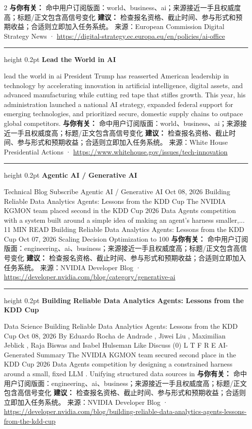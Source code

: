 \documentclass[10.5pt]{ctexart}
\begin{document}
\begin{multicols}{2}
\textbf{与你有关：} 命中用户订阅版面：world、business、ai；来源接近一手且权威度高；标题/正文包含高信号变化
\textbf{建议：} 检查报名资格、截止时间、参与形式和预期收益；合适则立即加入任务系统。
{\footnotesize\color{ormuted} 来源：European Commission Digital Strategy News · \url{https://digital-strategy.ec.europa.eu/en/policies/ai-office}}
\vspace{2mm}
\hrule height 0.2pt
\vspace{2mm}
{\large\bfseries Lead the World in AI}\par
lead the world in ai President Trump has reasserted American leadership in technology by accelerating innovation in artificial intelligence, digital assets, and advanced manufacturing while cutting red tape that stifles growth. This year, his administration launched a national AI strategy, expanded federal support for emerging technologies, and prioritized secure, domestic supply chains to outpace global competitors.
\textbf{与你有关：} 命中用户订阅版面：world、business、ai；来源接近一手且权威度高；标题/正文包含高信号变化
\textbf{建议：} 检查报名资格、截止时间、参与形式和预期收益；合适则立即加入任务系统。
{\footnotesize\color{ormuted} 来源：White House Presidential Actions · \url{https://www.whitehouse.gov/issues/tech-innovation}}
\vspace{2mm}
\hrule height 0.2pt
\vspace{2mm}
{\large\bfseries Agentic AI / Generative AI}\par
Technical Blog Subscribe Agentic AI / Generative AI Oct 08, 2026 Building Reliable Data Analytics Agents: Lessons from the KDD Cup The NVIDIA KGMON team placed second in the KDD Cup 2026 Data Agents competition with a system built around a simple idea of making an agent's harness smaller,... 11 MIN READ Building Reliable Data Analytics Agents: Lessons from the KDD Cup Oct 07, 2026 Scaling Decision Optimization to 100
\textbf{与你有关：} 命中用户订阅版面：engineering、ai、business；来源接近一手且权威度高；标题/正文包含高信号变化
\textbf{建议：} 检查报名资格、截止时间、参与形式和预期收益；合适则立即加入任务系统。
{\footnotesize\color{ormuted} 来源：NVIDIA Developer Blog · \url{https://developer.nvidia.com/blog/category/generative-ai}}
\vspace{2mm}
\hrule height 0.2pt
\vspace{2mm}
{\large\bfseries Building Reliable Data Analytics Agents: Lessons from the KDD Cup}\par
Data Science Building Reliable Data Analytics Agents: Lessons from the KDD Cup Oct 08, 2026 By Eduardo Rocha de Andrade , Jiwei Liu , Maximilian Jeblick , Raja Biswas and Isabel Hulseman Like Discuss (0) L T F R E AI-Generated Summary The NVIDIA KGMON team secured second place in the KDD Cup 2026 Data Agents competition by designing a constrained harness around a small, fixed LLM . Unifying structured data sources in
\textbf{与你有关：} 命中用户订阅版面：engineering、ai、business；来源接近一手且权威度高；标题/正文包含高信号变化
\textbf{建议：} 检查报名资格、截止时间、参与形式和预期收益；合适则立即加入任务系统。
{\footnotesize\color{ormuted} 来源：NVIDIA Developer Blog · \url{https://developer.nvidia.com/blog/building-reliable-data-analytics-agents-lessons-from-the-kdd-cup}}
\end{multicols}
\end{document}
